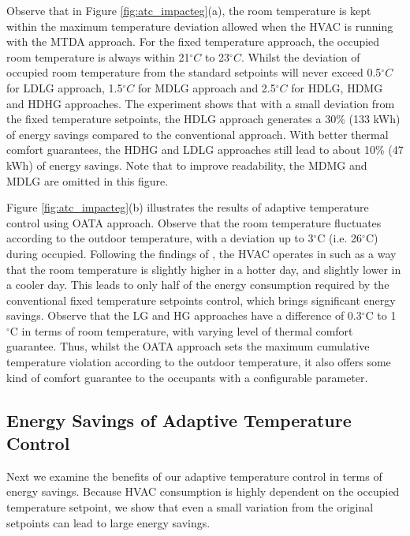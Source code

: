 Observe that in Figure \ref{fig:atc_impacteg}(a), the room temperature is kept within the maximum temperature deviation allowed when the HVAC is running with the MTDA approach. For the fixed temperature approach, the occupied room temperature is always within 21$^{\circ}C$ to 23$^{\circ}C$. Whilst the deviation of occupied room temperature from the standard setpoints will never exceed 0.5$^{\circ}C$ for LDLG approach, 1.5$^{\circ}C$ for MDLG  approach and 2.5$^{\circ}C$ for HDLG, HDMG and HDHG approaches. 
The experiment shows that with a small deviation from the fixed temperature setpoints, the HDLG approach generates a 30\% (133 kWh) of energy savings compared to the conventional approach. With better thermal comfort guarantees, the HDHG and LDLG approaches still lead to about 10\% (47 kWh) of energy savings. 
Note that to improve readability, the MDMG and MDLG are omitted in this figure. %

Figure \ref{fig:atc_impacteg}(b) illustrates the results of adaptive temperature control using OATA approach. Observe that the room temperature fluctuates according to the outdoor temperature, with a deviation up to 3$^{\circ}\mathrm{C}$ (i.e. 26$^{\circ}\mathrm{C}$) during occupied. Following the findings of \cite{de1998developing}, the HVAC operates in such as a way that the room temperature is slightly higher in a hotter day, and slightly lower in a cooler day. This leads to only half of the energy consumption required by the conventional fixed temperature setpoints control, which brings significant energy savings. Observe that the  LG and HG approaches have a difference of 0.3$^{\circ}\mathrm{C}$ to 1$^{\circ}\mathrm{C}$ in terms of room temperature, with varying level of thermal comfort guarantee. Thus, whilst the OATA approach sets the maximum cumulative temperature violation according to the outdoor temperature, it also offers some kind of comfort guarantee to the occupants with a configurable parameter.


\subsection{Energy Savings of Adaptive Temperature Control} \label{sec:atc_energy}

Next we examine the benefits of our adaptive temperature control in terms of energy savings. Because HVAC consumption is highly dependent on the occupied temperature setpoint, we show that even a small variation from the original setpoints can lead to large energy savings.

